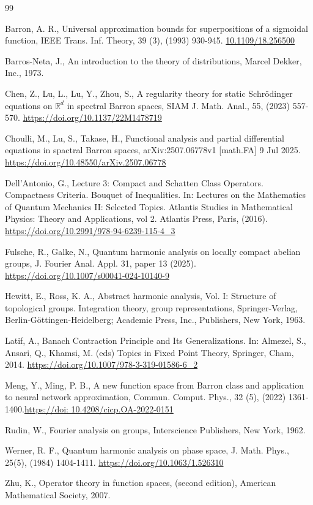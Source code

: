 \documentclass[11pt,a4paper]{amsart}
\begin{document}
\begin{thebibliography}{99}

 Barron, A. R.,  Universal approximation bounds for superpositions of a sigmoidal function, IEEE Trans. Inf. Theory,  39 (3), (1993) 930-945. \url{10.1109/18.256500}

 Barros-Neta, J.,  An introduction to the theory of distributions, Marcel Dekker, Inc., 1973.

  Chen, Z.,   Lu, L., Lu,  Y.,  Zhou, S.,  A regularity theory for static Schr\"odinger equations on $\mathbb{R}^d$ in spectral Barron spaces, SIAM J. Math. Anal., 55, (2023) 557-570. \url{https://doi.org/10.1137/22M1478719}

  Choulli, M.,  Lu, S., Takase, H., Functional analysis and partial differential equations in spactral Barron spaces, 
arXiv:2507.06778v1 [math.FA] 9 Jul 2025. \url{
https://doi.org/10.48550/arXiv.2507.06778
}




 
 Dell'Antonio, G., Lecture 3: Compact and Schatten Class Operators. Compactness Criteria. Bouquet of Inequalities. In: Lectures on the Mathematics of Quantum Mechanics II: Selected Topics. Atlantis Studies in Mathematical Physics: Theory and Applications, vol 2. Atlantis Press,  Paris, (2016). \url{https://doi.org/10.2991/978-94-6239-115-4_3}

  Fulsche, R.,   Galke, N., Quantum harmonic analysis on locally compact abelian groups, J. Fourier Anal. Appl. 31,  paper 13  (2025). \url{https://doi.org/10.1007/s00041-024-10140-9}

 Hewitt, E., Ross, K. A.,
Abstract harmonic analysis, Vol. I: Structure of topological groups. Integration theory, group representations, 
Springer-Verlag, Berlin-G\"ottingen-Heidelberg; Academic Press, Inc., Publishers, New York, 1963.


 Latif, A.,  Banach Contraction Principle and Its Generalizations. In: Almezel, S., Ansari, Q., Khamsi, M. (eds) Topics in Fixed Point Theory, Springer, Cham, 2014. \url{https://doi.org/10.1007/978-3-319-01586-6_2}

 Meng, Y., Ming, P. B.,  A new function space from Barron class and application to neural network approximation, Commun. Comput. Phys., 32 (5), (2022) 1361-1400.\url{https://doi: 10.4208/cicp.OA-2022-0151}

 Rudin, W., Fourier analysis on groups, Interscience Publishers, New York, 1962.

 Werner, R. F.,  Quantum harmonic analysis on phase space,  J. Math. Phys., 25(5), (1984) 1404-1411. \url{https://doi.org/10.1063/1.526310}

 Zhu, K., Operator theory in function spaces, (second edition),  American Mathematical
Society, 2007. 
\end{thebibliography}
\end{document}
